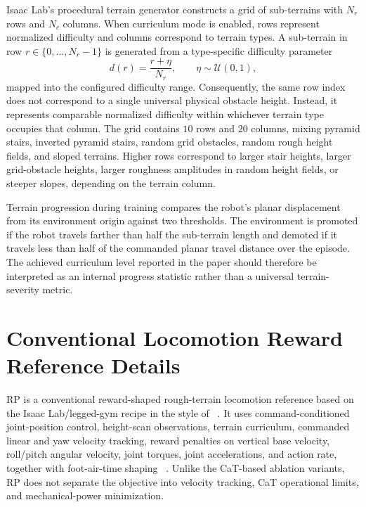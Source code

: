 \documentclass{article}
\newcommand{\baselineFive}{RP}
\begin{document}
    Isaac Lab's procedural terrain generator constructs a grid of sub-terrains with \(N_r\) rows and \(N_c\) columns. When curriculum mode is enabled, rows represent normalized difficulty and columns correspond to terrain types. A sub-terrain in row \(r\in\{0,\dots,N_r-1\}\) is generated from a type-specific difficulty parameter
    \[
    d(r)=\frac{r+\eta}{N_r}, \qquad \eta \sim \mathcal{U}(0,1),
    \]
    mapped into the configured difficulty range. Consequently, the same row index does not correspond to a single universal physical obstacle height. Instead, it represents comparable normalized difficulty within whichever terrain type occupies that column. The grid contains \(10\) rows and \(20\) columns, mixing pyramid stairs, inverted pyramid stairs, random grid obstacles, random rough height fields, and sloped terrains. Higher rows correspond to larger stair heights, larger grid-obstacle heights, larger roughness amplitudes in random height fields, or steeper slopes, depending on the terrain column.
    
    Terrain progression during training compares the robot's planar displacement from its environment origin against two thresholds. The environment is promoted if the robot travels farther than half the sub-terrain length and demoted if it travels less than half of the commanded planar travel distance over the episode. The achieved curriculum level reported in the paper should therefore be interpreted as an internal progress statistic rather than a universal terrain-severity metric.
       
    \section{Conventional Locomotion Reward Reference Details}
    \label{app:external-baseline-details}
	
    \baselineFive{} is a conventional reward-shaped rough-terrain locomotion reference based on the Isaac Lab/legged-gym recipe in the style of ~\citet{rudinLearningWalkMinutes2022a}. It uses command-conditioned joint-position control, height-scan observations, terrain curriculum, commanded linear and yaw velocity tracking, reward penalties on vertical base velocity, roll/pitch angular velocity, joint torques, joint accelerations, and action rate, together with foot-air-time shaping ~\citep{mittal2025isaaclab,rudinLearningWalkMinutes2022a}. Unlike the CaT-based ablation variants, \baselineFive{} does not separate the objective into velocity tracking, CaT operational limits, and mechanical-power minimization.
\end{document}
